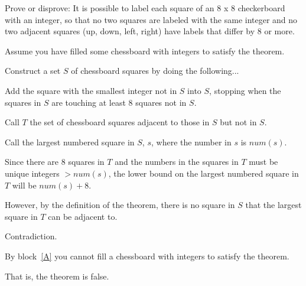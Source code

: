 \documentclass[11pt]{article}
\begin{document}
\begin{problems}


  \newpage

  \problem

  \begin{theorem}
      Prove or disprove: It is possible to label each square of an 8 x 8 checkerboard with an integer, 
      so that no two squares are labeled with the same integer and no two adjacent squares 
      (up, down, left, right) have labels that differ by 8 or more.
  \end{theorem}

  \smallskip

  \begin{longFormProof}

    \begin{block}[A]
      {Assume you have filled some chessboard with integers to satisfy the theorem.}

      \step Construct a set $S$ of chessboard squares by doing the following...

      \step Add the square with the smallest integer not in $S$ into $S$, stopping when the squares in $S$ are touching at least $8$ squares not in $S$.

      \step Call $T$ the set of chessboard squares adjacent to those in $S$ but not in $S$.

      \step Call the largest numbered square in $S$, $s$, where the number in $s$ is $num(s)$.

      \step Since there are $8$ squares in $T$ and the numbers in the squares in $T$ must be unique integers $> num(s)$, the lower bound on the largest numbered square in $T$ will be $num(s) + 8$.

      \step However, by the definition of the theorem, there is no square in $S$ that the largest square in $T$ can be adjacent to.

      \step Contradiction.

    \end{block}
    
    \step By block~\ref{A} you cannot fill a chessboard with integers to satisfy the theorem.

    \step That is, the theorem is false.
    
  \end{longFormProof}


\end{problems}
\end{document}
